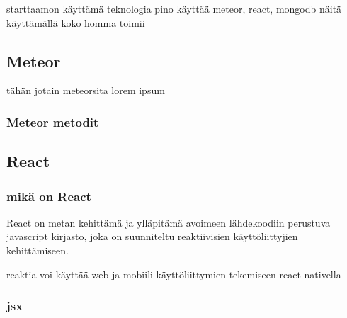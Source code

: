 \documentclass[11pt,a4paper,titlepage,oneside]{article}
\begin{document}
starttaamon käyttämä teknologia pino käyttää meteor, react, mongodb
näitä käyttämällä koko homma toimii





\subsection{Meteor}
tähän jotain meteorsita lorem ipsum

\subsubsection{Meteor metodit}





\newpage
\subsection{React}                %
\wordcount


\subsubsection{mikä on React}



React on metan kehittämä ja ylläpitämä avoimeen lähdekoodiin perustuva javascript kirjasto, joka on suunniteltu reaktiivisien käyttöliittyjien kehittämiseen.

reaktia voi käyttää web ja mobiili käyttöliittymien tekemiseen react nativella
\medskip








\subsubsection{jsx}


\end{document}
